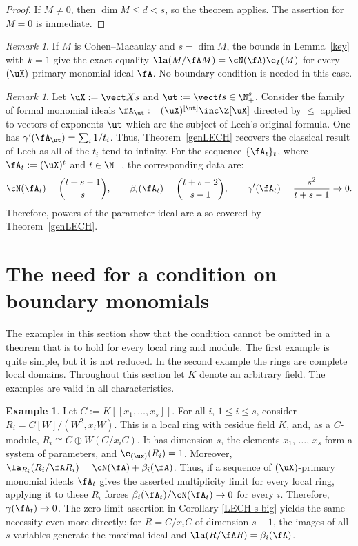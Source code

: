 \documentclass[12pt]{amsart}
\theoremstyle{plain}
\theoremstyle{remark}
\newtheorem{remark}[theorem]{Remark}
\theoremstyle{definition}
\newtheorem{example}[theorem]{Example}
\numberwithin{equation}{theorem}
\begin{document}
\begin{proof}
If $M \neq 0$, then $\dim M \leq d < s$, so the theorem applies.
The assertion for $M=0$ is immediate.
\end{proof}

\begin{remark} If $M$ is Cohen--Macaulay and $s=\dim M$, the bounds 
in Lemma~\ref{key} with $k=1$ give the exact equality
$\la(M/\fA M)=\cN(\fA )\e_I(M)$ for every $(\uX)$-primary monomial ideal $\fA$.
No boundary condition is needed in this case. 
\end{remark}

\begin{remark} Let $\uX := \vect X s$ and $\ut := \vect ts \in \N_+^s$.
Consider the family of formal monomial ideals $\fA_{\ut} := (\uX)^{[\ut]} \inc \Z[\uX]$ directed  
by $\leq$ applied to vectors of exponents $\ut$ which are the subject of 
Lech's original formula. One has $\gamma'(\fA_{\ut})=\sum_i 1/t_i$.  
Thus, Theorem~\ref{genLECH} recovers the classical result of Lech as all of the $t_i$ tend 
to infinity.  For the sequence 
$\{\fA_t\}_t$, where $\fA_t := (\uX)^t$ and $t \in \N_+$, 
the corresponding data are:
\[
 \cN(\fA_t)=\binom{t+s-1}{s},\qquad
 \beta_i(\fA_t)=\binom{t+s-2}{s-1},\qquad
 \gamma'(\fA_t)=\frac{s^2}{t+s-1} \to 0.
\]
Therefore, powers of the parameter ideal are also covered by Theorem~\ref{genLECH}.
\end{remark}

\section{The need for a condition on boundary monomials}

The examples in this section show that the \asb condition cannot be omitted in a theorem 
that is to hold for every local ring and module. The first example is quite simple, but it
is not reduced. In the second example the rings are complete local domains.
Throughout this section let $K$ denote an arbitrary field. The examples are valid in
all characteristics.

\begin{example}\label{nonreduced} 
Let $C := K[[x_1,\ldots,x_s]]$.  For all $i$, $1 \leq i \leq s$, consider
$R_i=C[W]/(W^2,x_iW).$ This is a local ring with residue field $K$, and, 
as a $C$-module, $R_i\cong C\oplus W(C/x_iC).$
It has dimension $s$, the elements $x_1,\,\ldots,\,x_s$ form a system of parameters, and 
$\e_{(\ux)}(R_i)=1$.  Moreover, 
$\la_{R_i}(R_i/\fA R_i)=\cN(\fA)+\beta_i(\fA)$.
Thus, if a sequence of $(\uX)$-primary monomial  ideals $\fA_t$ gives the asserted 
multiplicity limit for every local ring, applying it to these $R_i$ forces $\beta_i(\fA_t)/\cN(\fA_t)\to0$ 
for every $i$. Therefore, $\gamma(\fA_t) \to 0$.  
The zero limit assertion in Corollary \ref{LECH-s-big} yields the same necessity 
even more directly: for $R=C/x_iC$ of 
dimension $s-1$, the images of all $s$ variables generate the maximal ideal and 
$\la(R/\fA R) = \beta_i(\fA)$.
\end{example}
\end{document}
